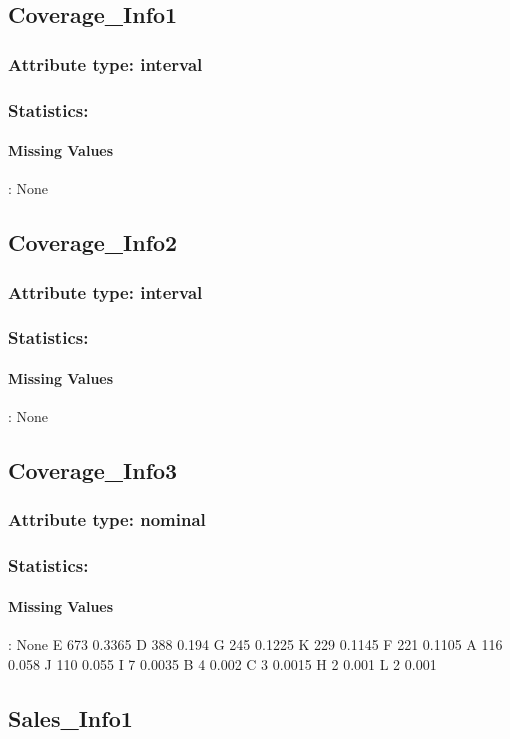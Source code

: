 \subsection{Coverage\_Info1}
\subsubsection{Attribute type: interval}
\subsubsection{Statistics: }
\paragraph{Missing Values}: None

\subsection{Coverage\_Info2}
\subsubsection{Attribute type: interval}
\subsubsection{Statistics: }
\paragraph{Missing Values}: None

\subsection{Coverage\_Info3}
\subsubsection{Attribute type: nominal}
\subsubsection{Statistics: }
\paragraph{Missing Values}: None
E	673	0.3365
D	388	0.194
G	245	0.1225
K	229	0.1145
F	221	0.1105
A	116	0.058
J	110	0.055
I	7	0.0035
B	4	0.002
C	3	0.0015
H	2	0.001
L	2	0.001

\subsection{Sales\_Info1}
